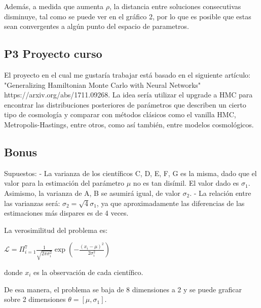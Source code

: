 \documentclass[11pt]{article}
\begin{document}
Además, a medida que aumenta \(\rho\), la distancia entre soluciones
consecutivas disminuye, tal como se puede ver en el gráfico 2, por lo
que es posible que estas sean convergentes a algún punto del espacio de
parametros.

    \subsection{P3 Proyecto curso}\label{p3-proyecto-curso}

    El proyecto en el cual me gustaría trabajar está basado en el siguiente
artículo: "Generalizing Hamiltonian Monte Carlo with Neural Networks"
https://arxiv.org/abs/1711.09268. La idea sería utilizar el upgrade a
HMC para encontrar las distribuciones posteriores de parámetros que
describen un cierto tipo de cosmología y comparar con métodos clásicos
como el vanilla HMC, Metropolis-Hastings, entre otros, como así también,
entre modelos cosmológicos.

    \subsection{Bonus}\label{bonus}

    Supuestos: - La varianza de los científicos C, D, E, F, G es la misma,
dado que el valor para la estimación del parámetro \(\mu\) no es tan
disímil. El valor dado es \(\sigma_{1}\). Asimismo, la varianza de A, B
se asumirá igual, de valor \(\sigma_{2}\). - La relación entre las
varianzas será: \(\sigma_{2} = \sqrt{4}\sigma_{1}\), ya que
aproximadamente las diferencias de las estimaciones más dispares es de 4
veces.

La verosimilitud del problema es:

\(\mathcal{L} = \Pi_{i=1}^{7} \frac{1}{\sqrt{2\pi\sigma_{i}^{2}}}\exp(-\frac{(x_{i} - \mu)^{2}}{2\sigma_{i}^{2}})\)

donde \(x_{i}\) es la observación de cada científico.

De esa manera, el problema se baja de 8 dimensiones a 2 y se puede
graficar sobre 2 dimensiones \(\theta = [\mu, \sigma_{1}]\).
\end{document}

